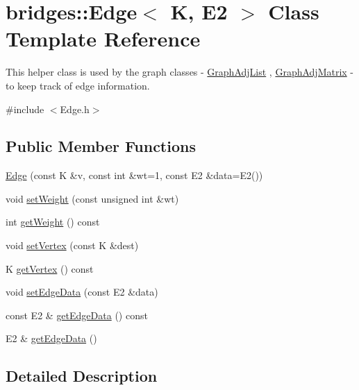 \hypertarget{classbridges_1_1_edge}{}\section{bridges\+:\+:Edge$<$ K, E2 $>$ Class Template Reference}
\label{classbridges_1_1_edge}


This helper class is used by the graph classes -\/ \mbox{\hyperlink{classbridges_1_1_graph_adj_list}{Graph\+Adj\+List}} , \mbox{\hyperlink{classbridges_1_1_graph_adj_matrix}{Graph\+Adj\+Matrix}} -\/ to keep track of edge information.  




{\ttfamily \#include $<$Edge.\+h$>$}

\subsection*{Public Member Functions}
\begin{DoxyCompactItemize}
\item 
\mbox{\hyperlink{classbridges_1_1_edge_a8a3fc4ec8164fcff2a7fc057d29db8c7}{Edge}} (const K \&v, const int \&wt=1, const E2 \&data=E2())
\item 
void \mbox{\hyperlink{classbridges_1_1_edge_a7f6a9e983490b32d698de7310ffa28c0}{set\+Weight}} (const unsigned int \&wt)
\item 
int \mbox{\hyperlink{classbridges_1_1_edge_a26c103abb7d17e569a764def3c254076}{get\+Weight}} () const
\item 
void \mbox{\hyperlink{classbridges_1_1_edge_a6818ee110efa9db2b16323ee443e9ab2}{set\+Vertex}} (const K \&dest)
\item 
K \mbox{\hyperlink{classbridges_1_1_edge_ab02ff346e56eca417ac8caddbbc870f4}{get\+Vertex}} () const
\item 
void \mbox{\hyperlink{classbridges_1_1_edge_a0f4b37731a5510b46709b095fa6eefb5}{set\+Edge\+Data}} (const E2 \&data)
\item 
const E2 \& \mbox{\hyperlink{classbridges_1_1_edge_a36e99b58bb9a3a04323ba9232673abca}{get\+Edge\+Data}} () const
\item 
E2 \& \mbox{\hyperlink{classbridges_1_1_edge_a59ce201560b26ec18a1947a38c82e36f}{get\+Edge\+Data}} ()
\end{DoxyCompactItemize}


\subsection{Detailed Description}
